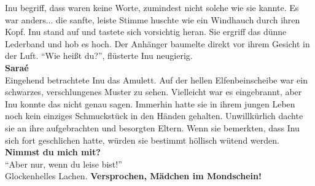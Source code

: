 \documentclass[a4paper,12pt]{book}
\begin{document}
Inu begriff, dass waren keine Worte, zumindest nicht solche wie sie kannte. Es war anders... die 
sanfte, leiste Stimme huschte wie ein Windhauch durch ihren Kopf. Inu stand auf und tastete sich 
vorsichtig heran.  Sie ergriff das dünne Lederband und hob es hoch. Der Anhänger baumelte direkt 
vor ihrem Gesicht in der Luft. ``Wie heißt du?'', flüsterte Inu neugierig.\\
\textbf{Saraé}\\
Eingehend betrachtete Inu das Amulett. Auf der hellen Elfenbeinscheibe war ein schwarzes, 
verschlungenes Muster zu sehen. Vielleicht war es eingebrannt, aber Inu konnte das nicht genau 
sagen. Immerhin hatte sie in ihrem jungen Leben noch kein einziges Schmuckstück in den Händen 
gehalten. Unwillkürlich dachte sie an ihre aufgebrachten und besorgten Eltern. Wenn sie bemerkten, 
dass Inu sich fort geschlichen hatte, würden sie bestimmt höllisch wütend werden.\\
\textbf{Nimmst du mich mit?}\\
``Aber nur, wenn du leise bist!''\\
Glockenhelles Lachen. \textbf{Versprochen, Mädchen im Mondschein!}\\
\end{document}
